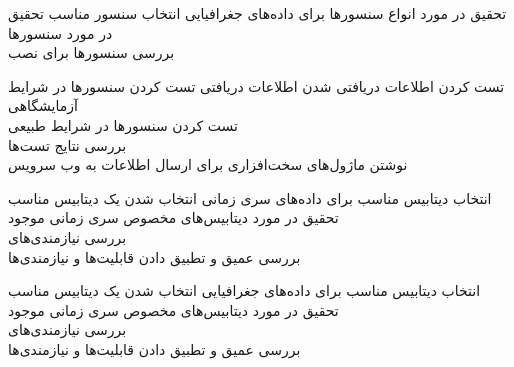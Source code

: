 \begin{wbsbox}{}
\begin{wbssub}
{تحقیق در مورد انواع سنسور‌ها برای داده‌های جغرافیایی}
{انتخاب سنسور مناسب}
\task
تحقیق در مورد سنسور‌ها \\
\task
بررسی سنسور‌ها برای نصب
\end{wbssub}

\begin{wbssub}
{تست کردن اطلاعات دریافتی}
{ شدن اطلاعات دریافتی}
\task
تست کردن سنسورها در شرایط آزمایشگاهی \\
\task
تست کردن سنسورها در شرایط طبیعی \\
\task
بررسی نتایج تست‌ها \\
\task
نوشتن ماژول‌های سخت‌افزاری برای ارسال اطلاعات به وب ‌سرویس
\end{wbssub}

\begin{wbssub}
{انتخاب دیتابیس مناسب برای داده‌های سری زمانی}
{انتخاب شدن یک دیتابیس مناسب}
\task
تحقیق در مورد دیتابیس‌‌های مخصوص سری زمانی موجود \\
\task
بررسی نیازمندی‌های 
 \\
\task
بررسی عمیق و تطبیق‌ دادن قابلیت‌ها و نیازمندی‌ها \\
\end{wbssub}

\begin{wbssub}
{انتخاب دیتابیس مناسب برای داده‌های جغرافیایی}
{انتخاب شدن یک دیتابیس مناسب}
\task
تحقیق در مورد دیتابیس‌‌های مخصوص سری زمانی موجود \\
\task
بررسی نیازمندی‌های 
 \\
\task
بررسی عمیق و تطبیق‌ دادن قابلیت‌ها و نیازمندی‌ها
\end{wbssub}
\end{wbsbox}

